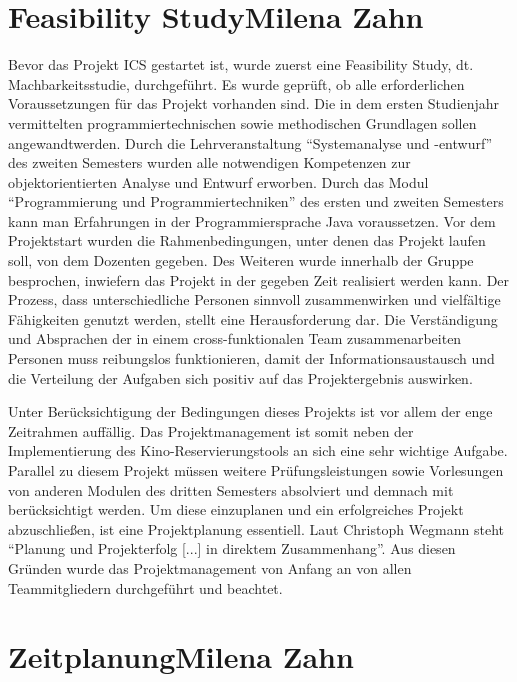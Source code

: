 	\section[Feasibility Study]{Feasibility Study{\hfill \normalsize Milena Zahn}}
	Bevor das Projekt \ac{ICS} gestartet ist, wurde zuerst eine Feasibility Study, dt. Machbarkeitsstudie, durchgeführt. Es wurde geprüft, ob alle erforderlichen Voraussetzungen für das Projekt vorhanden sind. Die in dem ersten Studienjahr vermittelten programmiertechnischen sowie methodischen Grundlagen sollen angewandtwerden. Durch die Lehrveranstaltung \enquote{Systemanalyse und -entwurf} des zweiten Semesters wurden alle notwendigen Kompetenzen zur objektorientierten Analyse und Entwurf erworben. Durch das Modul \enquote{Programmierung und Programmiertechniken} des ersten und zweiten Semesters kann man Erfahrungen in der Programmiersprache Java voraussetzen. Vor dem Projektstart wurden die Rahmenbedingungen, unter denen das Projekt laufen soll, von dem Dozenten gegeben. Des Weiteren wurde innerhalb der Gruppe besprochen, inwiefern das Projekt in der gegeben Zeit realisiert werden kann. Der Prozess, dass unterschiedliche Personen sinnvoll zusammenwirken und vielfältige Fähigkeiten genutzt werden, stellt eine Herausforderung dar. Die Verständigung und Absprachen der in einem cross-funktionalen Team zusammenarbeiten Personen muss reibungslos funktionieren, damit der Informationsaustausch und die Verteilung der Aufgaben sich positiv auf das Projektergebnis auswirken.
	
	Unter Berücksichtigung der Bedingungen dieses Projekts ist vor allem der enge Zeitrahmen auffällig. Das Projektmanagement ist somit neben der Implementierung des Kino-Reservierungstools an sich eine sehr wichtige Aufgabe. Parallel zu diesem Projekt müssen weitere Prüfungsleistungen sowie Vorlesungen von anderen Modulen des dritten Semesters absolviert und demnach mit berücksichtigt werden. Um diese einzuplanen und ein erfolgreiches Projekt abzuschließen, ist eine Projektplanung essentiell. Laut Christoph Wegmann steht \enquote{Planung und Projekterfolg [...] in direktem Zusammenhang}\autocite[][S. 73]{projektmanagement}. Aus diesen Gründen wurde das Projektmanagement von Anfang an von allen Teammitgliedern durchgeführt und beachtet.
	
	\section[Zeitplanung]{Zeitplanung{\hfill \normalsize Milena Zahn}} \label{projektplan}
